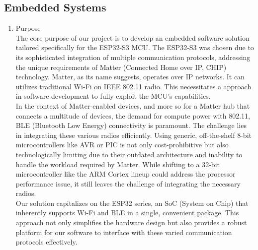 \documentclass[conference]{IEEEtran}
\begin{document}
\subsection{\large{Embedded Systems}}
\begin{enumerate}[label=\arabic*.]
\item Purpose\\
The core purpose of our project is to develop an embedded software solution tailored specifically for the ESP32-S3 MCU. The ESP32-S3 was chosen due to its sophisticated integration of multiple communication protocols, addressing the unique requirements of Matter (Connected Home over IP, CHIP) technology. Matter, as its name suggests, operates over IP networks. It can utilizes traditional Wi-Fi on IEEE 802.11 radio. This necessitates a approach in software development to fully exploit the MCU's capabilities.\\
In the context of Matter-enabled devices, and more so for a Matter hub that connects a multitude of devices, the demand for compute power with 802.11,  BLE (Bluetooth Low Energy) connectivity is paramount. The challenge lies in integrating these various radios efficiently. Using generic, off-the-shelf 8-bit microcontrollers like AVR or PIC is not only cost-prohibitive but also technologically limiting due to their outdated architecture and inability to handle the workload required by Matter. While shifting to a 32-bit microcontroller like the ARM Cortex lineup could address the processor performance issue, it still leaves the challenge of integrating the necessary radios.\\
Our solution capitalizes on the ESP32 series, an SoC (System on Chip) that inherently supports Wi-Fi and BLE in a single, convenient package. This approach not only simplifies the hardware design but also provides a robust platform for our software to interface with these varied communication protocols effectively.\\


\end{enumerate}
\end{document}
